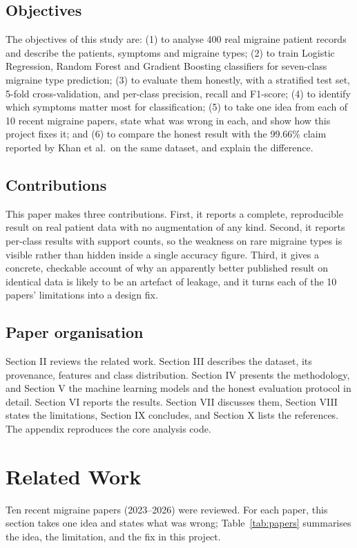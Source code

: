 \documentclass[conference]{IEEEtran}
\begin{document}
\subsection{Objectives}
The objectives of this study are: (1) to analyse 400 real migraine patient records and describe the patients, symptoms and migraine types; (2) to train Logistic Regression, Random Forest and Gradient Boosting classifiers for seven-class migraine type prediction; (3) to evaluate them honestly, with a stratified test set, 5-fold cross-validation, and per-class precision, recall and F1-score; (4) to identify which symptoms matter most for classification; (5) to take one idea from each of 10 recent migraine papers, state what was wrong in each, and show how this project fixes it; and (6) to compare the honest result with the 99.66\% claim reported by Khan et al.\ on the same dataset, and explain the difference.

\subsection{Contributions}
This paper makes three contributions. First, it reports a complete, reproducible result on real patient data with no augmentation of any kind. Second, it reports per-class results with support counts, so the weakness on rare migraine types is visible rather than hidden inside a single accuracy figure. Third, it gives a concrete, checkable account of why an apparently better published result on identical data is likely to be an artefact of leakage, and it turns each of the 10 papers' limitations into a design fix.

\subsection{Paper organisation}
Section II reviews the related work. Section III describes the dataset, its provenance, features and class distribution. Section IV presents the methodology, and Section V the machine learning models and the honest evaluation protocol in detail. Section VI reports the results. Section VII discusses them, Section VIII states the limitations, Section IX concludes, and Section X lists the references. The appendix reproduces the core analysis code.

\section{Related Work}
Ten recent migraine papers (2023--2026) were reviewed. For each paper, this section takes one idea and states what was wrong; Table~\ref{tab:papers} summarises the idea, the limitation, and the fix in this project.
\end{document}
